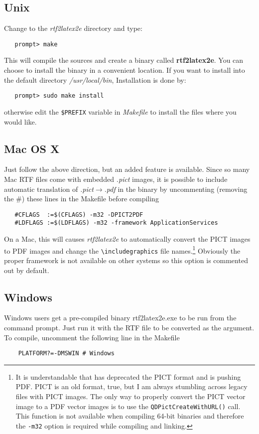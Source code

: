 \documentclass{article}
\def\rtf2latex2e{{\it rtf2latex2e}}
\begin{document}
\subsection{Unix \label{Unix_install}}
Change to the \textit{rtf2latex2e} directory and type:
\begin{verbatim}
   prompt> make
\end{verbatim}
This will compile the sources and create a binary called
\textbf{rtf2latex2e}.
You can choose to install the binary in a convenient location.
If you want to install into the default directory
\textit{/usr/local/bin},
Installation is done by:
\begin{verbatim}
   prompt> sudo make install
\end{verbatim}
otherwise edit the \texttt{\$PREFIX} variable in \textit{Makefile}
to install the files where you would like. 

\subsection{Mac OS X}
Just follow the above direction, but an added feature is available.
Since so many Mac RTF files come with embedded \textit{.pict} images, 
it is possible to include automatic translation of \textit{.pict}$\rightarrow$\textit{.pdf}
in the binary by uncommenting (removing the \#) these lines in the Makefile before
compiling
\begin{verbatim}
   #CFLAGS  :=$(CFLAGS) -m32 -DPICT2PDF
   #LDFLAGS :=$(LDFLAGS) -m32 -framework ApplicationServices
\end{verbatim}
On a Mac, this will causes {\rtf2latex2e} to automatically convert the PICT images to PDF images
and change the \verb#\includegraphics# file names.\footnote{It is understandable that 
has deprecated the PICT format and is pushing PDF.  PICT is an old format, true,
but I am always stumbling across legacy files with PICT images.  The only way to properly
convert the PICT vector image to a PDF vector images is to use the \texttt{QDPictCreateWithURL()}
call.  This function is not available when compiling 64-bit binaries and therefore the \texttt{-m32}
option is required while compiling and linking. }  Obviously the proper framework is
not available on other systems so this option is commented out by default.

\subsection{Windows}
Windows users get a pre-compiled binary rtf2latex2e.exe to be run from
the command prompt. Just run it with the RTF file to be converted as the argument.
To compile, uncomment the following line in the Makefile
\begin{verbatim}
    PLATFORM?=-DMSWIN # Windows
\end{verbatim}
\end{document}
